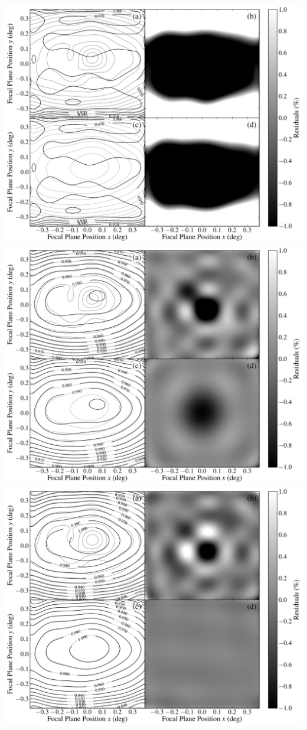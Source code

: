 \documentclass[pdftex]{beamer}
\begin{document}
\begin{frame}
\includegraphics[height=0.44\textheight]{./A_8192_ff.pdf}
\includegraphics[height=0.44\textheight]{./B_4160_ff.pdf} \\
\includegraphics[height=0.44\textheight]{./C_026_ff.pdf}

\end{frame}
\end{document}
